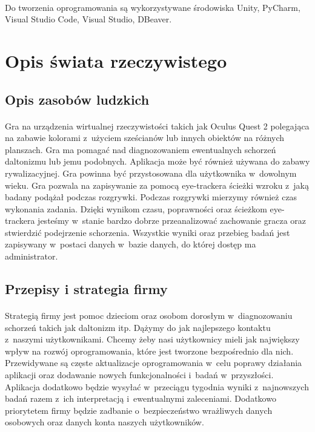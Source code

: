 \documentclass[12pt, letterpaper]{article}
\begin{document}
\paragraph{}
Do tworzenia oprogramowania są wykorzystywane środowiska Unity, PyCharm, Visual Studio Code, Visual Studio, DBeaver.

\newpage

\section{Opis świata rzeczywistego}
\subsection{Opis zasobów ludzkich}
\paragraph{}
Gra na urządzenia wirtualnej rzeczywistości takich jak Oculus Quest 2 polegająca na zabawie kolorami z~użyciem sześcianów lub innych obiektów na różnych planszach. Gra ma pomagać nad diagnozowaniem ewentualnych schorzeń daltonizmu lub jemu podobnych. Aplikacja może być również używana do zabawy rywalizacyjnej. Gra powinna być przystosowana dla użytkownika w~dowolnym wieku. Gra pozwala na zapisywanie za pomocą eye-trackera ścieżki wzroku z~jaką badany podążał podczas rozgrywki. Podczas rozgrywki mierzymy również czas wykonania zadania. Dzięki wynikom czasu, poprawności oraz ścieżkom eye-trackera jesteśmy w~stanie bardzo dobrze przeanalizować zachowanie gracza oraz stwierdzić podejrzenie schorzenia. Wszystkie wyniki oraz przebieg badań jest zapisywany w~postaci danych w~bazie danych, do której dostęp ma administrator.
	

\subsection{Przepisy i strategia firmy}
\paragraph{}	
Strategią firmy jest pomoc dzieciom oraz osobom dorosłym w~diagnozowaniu schorzeń takich jak daltonizm itp. Dążymy do jak najlepszego kontaktu z~naszymi użytkownikami. Chcemy żeby nasi użytkownicy mieli jak największy wpływ na rozwój oprogramowania, które jest tworzone bezpośrednio dla nich. Przewidywane są częste aktualizacje oprogramowania w~celu poprawy działania aplikacji oraz dodawanie nowych funkcjonalności i~badań w~przyszłości. Aplikacja dodatkowo będzie wysyłać w~przeciągu tygodnia wyniki z~najnowszych badań razem z~ich interpretacją i~ewentualnymi zaleceniami. Dodatkowo priorytetem firmy będzie zadbanie o~bezpieczeństwo wrażliwych danych osobowych oraz danych konta naszych użytkowników.
	
\end{document}
